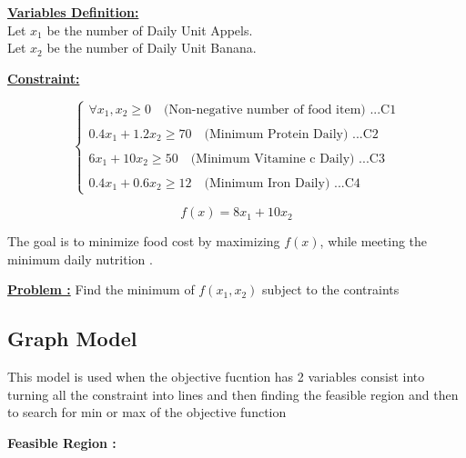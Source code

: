 \vspace{1cm}

\begin{multicols}{2}
\textbf{\underline{Variables Definition:}}\\

Let \(x_1\) be the number of Daily Unit Appels.\\

Let \(x_2\) be the number of Daily Unit Banana.\\
\columnbreak

\textbf{\underline{Constraint:}} 

\[
\left\{
    \begin{array}{l}
        \forall x_1 , x_2 \geq 0 \quad \text{(Non-negative number of food item) ...C1}\\\\
        0.4x_1 + 1.2x_2  \geq 70 \quad \text{(Minimum Protein Daily) ...C2}\\\\ 
        6x_1 + 10x_2  \geq 50 \quad \text{(Minimum Vitamine c Daily) ...C3}\\\\
        0.4x_1 + 0.6x_2  \geq 12 \quad \text{(Minimum Iron Daily) ...C4}
   \end{array}
   \right.
\] 
\end{multicols}
\vspace{0.5cm}
\begin{tcolorbox}[title = Objectif Function]
\[
f(x) = 8x_1 + 10x_2  
\]
\begin{center}
The goal is to minimize food cost by maximizing \(f(x)\), while meeting the minimum daily nutrition .
\end{center}
\end{tcolorbox}
\vspace{1cm} 
\textbf{\underline{Problem :}} Find the minimum of \(f(x_1,x_2) \) subject to the contraints\\
\subsection{Graph Model}
This model is used when the objective fucntion has 2 variables consist into turning all the constraint into 
lines and then finding the feasible region and then to search for min or max of the objective function 

\vspace{1cm}
\textbf{Feasible Region :}

